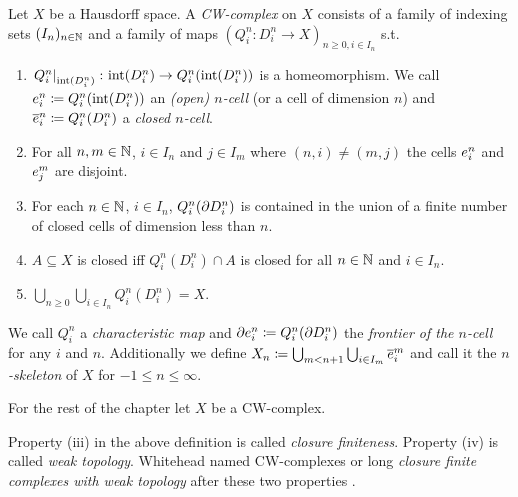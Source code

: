 \begin{defi}\label{defi:CWComplex2}
    Let $X$ be a Hausdorff space.
    A \emph{CW-complex} on $X$ consists of a family of indexing sets $(I_n)_{n \in \bN}$ and a family of maps $(Q_i^n\colon D_i^n\rightarrow X)_{n \ge 0, i \in I_n}$ s.t.
    \begin{enumerate}
        \item $\restrict{Q_i^n}{\interior{D_i^n}}\colon \interior{D_i^n} \rightarrow Q_i^n(\interior{D_i^n})$ is a homeomorphism. We call $\openCell{n}{i} \coloneq Q_i^n(\interior{D_i^n})$ an \emph{(open) $n$-cell} (or a cell of dimension $n$) and $\closedCell{n}{i} \coloneq Q_i^n(D_i^n)$ a \emph{closed $n$-cell}.
        \item For all $n, m \in \bN$, $i \in I_n$ and $j \in I_m$ where $(n, i) \ne (m, j)$ the cells $\openCell{n}{i}$ and $\openCell{m}{j}$ are disjoint.
        \item For each $n \in \bN$, $i \in I_n$, $Q_i^n(\boundary D_i^n)$ is contained in the union of a finite number of closed cells of dimension less than $n$.
        \item $A \subseteq X$ is closed iff $Q_i^n(D_i^n) \cap A$ is closed for all $n \in \bN$ and $i \in I_n$.
        \item $\bigcup_{n \ge 0}\bigcup_{i \in I_n} Q_i^n(D_i^n) = X$.
    \end{enumerate}
    We call $Q_i^n$ a \emph{characteristic map} and $\cellFrontier{n}{i} \coloneq Q_i^n(\boundary D_i^n)$ the \emph{frontier of the $n$-cell} for any $i$ and $n$.
    Additionally we define $X_n \coloneq \bigcup_{m < n + 1} \bigcup_{i \in I_m} \closedCell{m}{i}$ and call it the \emph{$n$-skeleton} of $X$ for $-1 \le n \le \infty$.
\end{defi}


For the rest of the chapter let $X$ be a CW-complex.

\begin{rem}
    Property (iii) in the above definition is called \emph{closure finiteness}.
    Property (iv) is called \emph{weak topology}.
    Whitehead named CW-complexes or long \emph{closure finite complexes with weak topology} after these two properties \cite{Whitehead2018}.
\end{rem}

